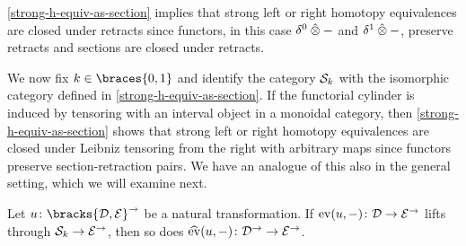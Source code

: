 \documentclass[reqno,10pt,a4paper,oneside,draft]{amsart}
\begin{document}
\begin{remark}
\cref{strong-h-equiv-as-section} implies that strong left or right homotopy equivalences are closed under retracts since functors, in this case $\delta^0 \hatotimes -$ and $\delta^1 \hatotimes -$, preserve retracts and sections are closed under retracts.
\end{remark}

We now fix $k \in \braces{0, 1}$ and identify the category $\cal{S}_k$ with the isomorphic category defined in \cref{strong-h-equiv-as-section}.
If the functorial cylinder is induced by tensoring with an interval object in a monoidal category, then \cref{strong-h-equiv-as-section} shows that strong left or right homotopy equivalences are closed under Leibniz tensoring from the right with arbitrary maps since functors preserve section-retraction pairs.
We have an analogue of this also in the general setting, which we will examine next.

\begin{lemma} \label{leibniz-lift}
Let $u \co \bracks{\cal{D}, \cal{E}}^\to$ be a natural transformation.
If $\eval(u, -) \co \cal{D} \to \cal{E}^\to$ lifts through $\cal{S}_k \to \catE^\to$, then so does $\hateval(u, -) \co \cal{D}^\to \to \catE^\to$.
\end{lemma}
\end{document}
